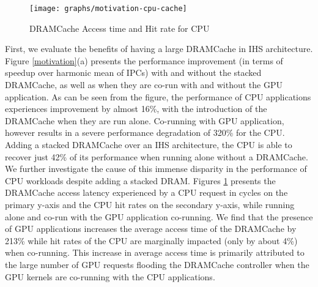 \begin{figure}[htbp]
   \texttt{[image: graphs/motivation-cpu-cache]}
   \caption{DRAMCache Access time and Hit rate for CPU}
   \label{fig:motivation-cpu-cache}
\end{figure}
First, we evaluate the benefits of having a large DRAMCache in IHS architecture. Figure \ref{motivation}(a) presents the performance
improvement (in terms of speedup over harmonic mean of IPCs) with and without
the stacked DRAMCache, as well as when they are co-run with and without the GPU application. As can be seen from the figure,
the performance of CPU applications experiences improvement by almost 16\%, with the introduction 
of the DRAMCache when they are run alone. Co-running with GPU application, however results in a severe performance degradation of 320\% for the CPU. 
Adding a stacked DRAMCache over an IHS architecture, the CPU is able to recover just 42\% of its performance when running alone without a DRAMCache. 
We further investigate the cause of this immense disparity in the performance of CPU workloads despite adding a stacked DRAM. Figures \ref{fig:motivation-cpu-cache} presents the DRAMCache access latency experienced by a CPU request in cycles on the primary y-axis and the CPU hit rates on the secondary y-axis, while running alone and co-run with the GPU application co-running. We find that the presence of GPU applications increases the average access time of the DRAMCache by 213\% while hit rates of the CPU are marginally impacted (only by about 4\%) when co-running.
This increase in average access time is primarily attributed to the large
number of GPU requests flooding the DRAMCache controller when the GPU kernels are co-running with the CPU applications.

